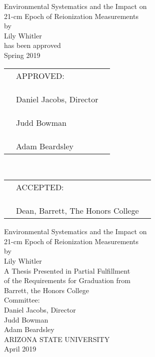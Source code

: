 \documentclass[12pt]{article}
\begin{document}
\doublespacing
\begin{center}
Environmental Systematics and the Impact on \\ 21-cm Epoch of Reionization Measurements \\
by \\
Lily Whitler \\
has been approved \\
Spring 2019 \\[0.1\textheight]

\begingroup
\renewcommand{\arraystretch}{0.7}
\begin{tabular}{p{1cm}p{3.5in}p{1cm}}
	& \centering APPROVED: & \\
	& & \\ & & \\
	& \hrulefill & \\
	& \hfill Daniel Jacobs, Director & \\
	& & \\ & & \\
	& \hrulefill & \\
	& \hfill Judd Bowman & \\
	& & \\ & & \\
	& \hrulefill & \\
	& \hfill Adam Beardsley &
\end{tabular} \\[0.075\textheight]
\begin{tabular}{p{1cm}p{3.5in}p{1cm}}
	& \centering ACCEPTED: & \\
	& & \\ & & \\
	& \hrulefill & \\
	& \hfill Dean, Barrett, The Honors College &
\end{tabular}
\endgroup
\end{center}
\thispagestyle{empty}
\newpage
{}

\begin{center}
	{\Large Environmental Systematics and the Impact on \\ 21-cm Epoch of Reionization Measurements} \\
	by \\
	Lily Whitler \\[0.15\textheight]
	
	A Thesis Presented in Partial Fulfillment \\
	of the Requirements for Graduation from \\
	Barrett, the Honors College \\[0.15\textheight]
	
	Committee: \\
	Daniel Jacobs, Director \\
	Judd Bowman \\
	Adam Beardsley \\[0.2\textheight]
	
	ARIZONA STATE UNIVERSITY \\
	April 2019
\end{center}
\thispagestyle{empty}
\end{document}
